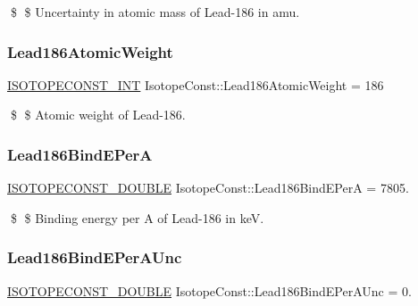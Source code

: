 \$ \$ Uncertainty in atomic mass of Lead-\/186 in amu. \mbox{\label{group___isotope_const-_lead-_pb186_ga22f8451ab6bfadcf61ba9a36a6514cba}} 
\subsubsection{\texorpdfstring{Lead186\+Atomic\+Weight}{Lead186AtomicWeight}}
{\footnotesize\ttfamily \mbox{\hyperlink{group___isotope_const-_macros_ga5f18360b3e99483a35c32d789e62621c}{I\+S\+O\+T\+O\+P\+E\+C\+O\+N\+S\+T\+\_\+\+I\+NT}} Isotope\+Const\+::\+Lead186\+Atomic\+Weight = 186}

\$ \$ Atomic weight of Lead-\/186. \mbox{\label{group___isotope_const-_lead-_pb186_ga5454574a07e09805344907fec7e20aee}} 
\subsubsection{\texorpdfstring{Lead186\+Bind\+E\+PerA}{Lead186BindEPerA}}
{\footnotesize\ttfamily \mbox{\hyperlink{group___isotope_const-_macros_ga8f45a7272ce02c0b4c65c44636ed719a}{I\+S\+O\+T\+O\+P\+E\+C\+O\+N\+S\+T\+\_\+\+D\+O\+U\+B\+LE}} Isotope\+Const\+::\+Lead186\+Bind\+E\+PerA = 7805.}

\$ \$ Binding energy per A of Lead-\/186 in keV. \mbox{\label{group___isotope_const-_lead-_pb186_ga451124b978c30806e315cf88dde24d9f}} 
\subsubsection{\texorpdfstring{Lead186\+Bind\+E\+Per\+A\+Unc}{Lead186BindEPerAUnc}}
{\footnotesize\ttfamily \mbox{\hyperlink{group___isotope_const-_macros_ga8f45a7272ce02c0b4c65c44636ed719a}{I\+S\+O\+T\+O\+P\+E\+C\+O\+N\+S\+T\+\_\+\+D\+O\+U\+B\+LE}} Isotope\+Const\+::\+Lead186\+Bind\+E\+Per\+A\+Unc = 0.}

